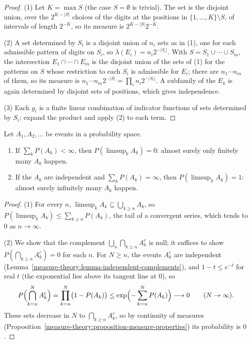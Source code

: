 \begin{proof}
(1) Let $K = \max S$ (the case $S = \emptyset$ is trivial). The set is the disjoint union, over the $2^{K - |S|}$ choices of the digits at the positions in $\{1, \ldots, K\} \setminus S$, of intervals of length
$2^{-K}$, so its measure is $2^{K - |S|}2^{-K}$.

(2) A set determined by $S_i$ is a disjoint union of $n_i$ sets as in (1), one for each admissible pattern of digits on $S_i$, so $\lambda(E_i) = n_i2^{-|S_i|}$. With $S = S_1 \cup \cdots \cup S_m$, the
intersection $E_1 \cap \cdots \cap E_m$ is the disjoint union of the sets of (1) for the patterns on $S$ whose restriction to each $S_i$ is admissible for $E_i$; there are $n_1 \cdots n_m$ of them, so its
measure is $n_1 \cdots n_m2^{-|S|} = \prod_in_i2^{-|S_i|}$. A subfamily of the $E_k$ is again determined by disjoint sets of positions, which gives independence.

(3) Each $g_i$ is a finite linear combination of indicator functions of sets determined by $S_i$; expand the product and apply (2) to each term.
\end{proof}

\begin{theorem}\label{measure-theory:theorem-borel-cantelli}
Let $A_1, A_2, \ldots$ be events in a probability space.
\begin{enumerate}
\item If $\sum_kP(A_k) < \infty$, then $P(\limsup_kA_k) = 0$: almost surely only finitely many $A_k$ happen.
\item If the $A_k$ are independent and $\sum_kP(A_k) = \infty$, then $P(\limsup_kA_k) = 1$: almost surely infinitely many $A_k$ happen.
\end{enumerate}
\end{theorem}

\begin{proof}
(1) For every $n$, $\limsup_kA_k \subseteq \bigcup_{k \geq n}A_k$, so $P(\limsup_kA_k) \leq \sum_{k \geq n}P(A_k)$, the tail of a convergent series, which tends to $0$ as $n \to \infty$.

(2) We show that the complement $\bigcup_n\bigcap_{k \geq n}A_k^c$ is null; it suffices to show $P(\bigcap_{k \geq n}A_k^c) = 0$ for each $n$. For $N \geq n$, the events $A_k^c$ are independent
(Lemma~\ref{measure-theory:lemma-independent-complements}), and $1 - t \leq e^{-t}$ for real $t$ (the exponential lies above its tangent line at $0$), so
\[
P\Bigl(\bigcap_{k = n}^NA_k^c\Bigr) = \prod_{k = n}^N\bigl(1 - P(A_k)\bigr) \leq \exp\Bigl(-\sum_{k = n}^NP(A_k)\Bigr) \longrightarrow 0 \qquad (N \to \infty).
\]
These sets decrease in $N$ to $\bigcap_{k \geq n}A_k^c$, so by continuity of measures (Proposition~\ref{measure-theory:proposition-measure-properties}) its probability is $0$.
\end{proof}

